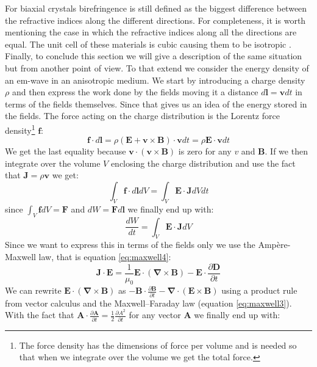 For biaxial crystals birefringence is still defined as the biggest difference between the refractive indices along the different directions. For completeness, it is worth mentioning the case in which the refractive indices along all the directions are equal. The unit cell of these materials is cubic causing them to be isotropic \cite{HechtOpticsEdition}. 
Finally, to conclude this section we will give a description of the same situation but from another point of view. To that extend we consider the energy density of an em-wave in an anisotropic medium.
We start by introducing a charge density $\rho$ and then express the work done by the fields moving it a distance $d\bm{l}=\bm{v}dt$ in terms of the fields themselves. Since that gives us an idea of the energy stored in the fields. The force acting on the charge distribution is the Lorentz force density\footnote{The force density has the dimensions of force per volume and is needed so that when we integrate over the volume we get the total force.} $\bm{f}$:
\begin{equation}
    \bm{f}\cdot d\bm{l}=\rho(\bm{E}+\bm{v}\times\bm{B})\cdot\bm{v}dt=\rho\bm{E}\cdot\bm{v}dt
\end{equation}
We get the last equality because $\bm{v}\cdot(\bm{v}\times\bm{B})$ is zero for any $v$ and $\bm{B}$. 
If we then integrate over the volume $V$ enclosing the charge distribution and use the fact that $\bm{J}=\rho\bm{v}$ we get:
\begin{equation}
    \int_V \bm{f}\cdot d\bm{l} dV =\int_V \bm{E}\cdot\bm{J} dVdt
\end{equation}
since $\int_V \bm{f} dV = \bm{F}$ and $dW = \bm{F} d\bm{l}$ we finally end up with:
\begin{equation}
    \label{eq:emf_work}
    \frac{dW}{dt} = \int_V \bm{E}\cdot\bm{J} dV
\end{equation}
Since we want to express this in terms of the fields only we use the Ampère-Maxwell law, that is equation \ref{eq:maxwell4}:
\begin{equation}
    \bm{J}\cdot\bm{E} = \frac{1}{\mu_0}\bm{E}\cdot(\bm{\nabla}\times\bm{B})-\bm{E}\cdot\frac{\partial\bm{D}}{\partial t}
\end{equation}
We can rewrite $\bm{E}\cdot(\bm{\nabla}\times\bm{B})$ as $-\bm{B}\cdot\frac{\partial \bm{B}}{\partial t} - \bm{\nabla}\cdot(\bm{E}\times\bm{B})$ using a product rule from vector calculus and the Maxwell–Faraday law (equation \ref{eq:maxwell3}). With the fact that $\bm{A}\cdot\frac{\partial \bm{A}}{\partial t} = \frac{1}{2} \frac{\partial A^2}{\partial t}$ for any vector $\bm{A}$ we finally end up with:
